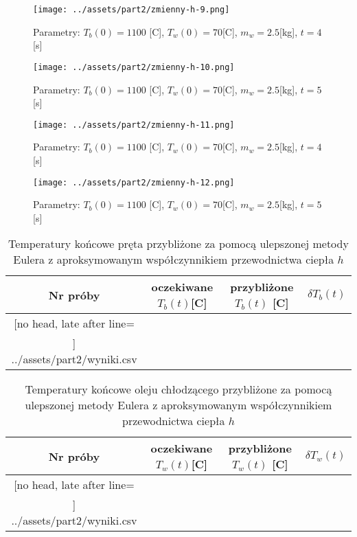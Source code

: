 \documentclass[
	12pt, %
]{fphw}
\begin{document}
\begin{figure}[H]
	\texttt{[image: ../assets/part2/zmienny-h-9.png]}
	\caption{Parametry: \(T_b(0) = 1100\) [\textdegree{}C], \(T_w(0) = 70\)[\textdegree{}C], \(m_w = 2.5\)[kg], \(t = 4\)[s]}

	\texttt{[image: ../assets/part2/zmienny-h-10.png]}
	\caption{Parametry: \(T_b(0) = 1100\) [\textdegree{}C], \(T_w(0) = 70\)[\textdegree{}C], \(m_w = 2.5\)[kg], \(t = 5\)[s]}
\end{figure}

\begin{figure}[H]
	\texttt{[image: ../assets/part2/zmienny-h-11.png]}
	\caption{Parametry: \(T_b(0) = 1100\) [\textdegree{}C], \(T_w(0) = 70\)[\textdegree{}C], \(m_w = 2.5\)[kg], \(t = 4\)[s]}

	\texttt{[image: ../assets/part2/zmienny-h-12.png]}
	\caption{Parametry: \(T_b(0) = 1100\) [\textdegree{}C], \(T_w(0) = 70\)[\textdegree{}C], \(m_w = 2.5\)[kg], \(t = 5\)[s]}
\end{figure}

\begin{table}[H]
	\begin{tabular}{|c|c|c|c|}\hline%
	Nr próby & oczekiwane \(T_b(t)\)[\textdegree{}C] & przybliżone \(T_b(t)\) [\textdegree{}C] & \(\delta T_b(t)\) \\\hline
	\csvreader[no head, late after line=\\\hline]%
	{../assets/part2/wyniki.csv}{}%
	{\thecsvrow&\csvcoli&\csvcoliii&\csvcoliv}%
	\end{tabular}
	\caption{Temperatury końcowe pręta przybliżone za pomocą ulepszonej metody Eulera z aproksymowanym współczynnikiem przewodnictwa ciepła \(h\)}
	\label{tab:approx-wyniki-1}
\end{table}

\begin{table}[H]
	\begin{tabular}{|c|c|c|c|}\hline%
	Nr próby & oczekiwane \(T_w(t)\)[\textdegree{}C] & przybliżone \(T_w(t)\) [\textdegree{}C] & \(\delta T_w(t)\) \\\hline
	\csvreader[no head, late after line=\\\hline]%
	{../assets/part2/wyniki.csv}{}%
	{\thecsvrow&\csvcolii&\csvcolv&\csvcolvi}%
	\end{tabular}
	\caption{Temperatury końcowe oleju chłodzącego przybliżone za pomocą ulepszonej metody Eulera z aproksymowanym współczynnikiem przewodnictwa ciepła \(h\)}
	\label{tab:approx-wyniki-2}
\end{table}
\end{document}
